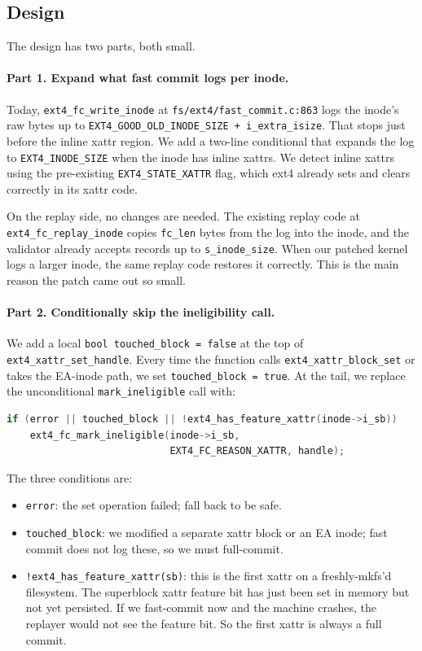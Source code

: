 \documentclass[11pt,a4paper]{article}
\begin{document}
\subsection{Design}

The design has two parts, both small.

\paragraph{Part 1. Expand what fast commit logs per inode.} Today,
\texttt{ext4\_fc\_write\_inode} at \texttt{fs/ext4/fast\_commit.c:863}
logs the inode's raw bytes up to
\texttt{EXT4\_GOOD\_OLD\_INODE\_SIZE + i\_extra\_isize}. That stops
just before the inline xattr region. We add a two-line conditional
that expands the log to \texttt{EXT4\_INODE\_SIZE} when the inode
has inline xattrs. We detect inline xattrs using the pre-existing
\texttt{EXT4\_STATE\_XATTR} flag, which ext4 already sets and clears
correctly in its xattr code.

On the replay side, no changes are needed. The existing replay code
at \texttt{ext4\_fc\_replay\_inode} copies \texttt{fc\_len} bytes
from the log into the inode, and the validator already accepts
records up to \texttt{s\_inode\_size}. When our patched kernel logs
a larger inode, the same replay code restores it correctly. This is
the main reason the patch came out so small.

\paragraph{Part 2. Conditionally skip the ineligibility call.} We
add a local \texttt{bool touched\_block = false} at the top of
\texttt{ext4\_xattr\_set\_handle}. Every time the function calls
\texttt{ext4\_xattr\_block\_set} or takes the EA-inode path, we set
\texttt{touched\_block = true}. At the tail, we replace the
unconditional \texttt{mark\_ineligible} call with:

\begin{lstlisting}[language=C]
if (error || touched_block || !ext4_has_feature_xattr(inode->i_sb))
    ext4_fc_mark_ineligible(inode->i_sb,
                            EXT4_FC_REASON_XATTR, handle);
\end{lstlisting}

The three conditions are:
\begin{itemize}[leftmargin=*]
  \item \texttt{error}: the set operation failed; fall back to be
        safe.
  \item \texttt{touched\_block}: we modified a separate xattr block
        or an EA inode; fast commit does not log these, so we must
        full-commit.
  \item \texttt{!ext4\_has\_feature\_xattr(sb)}: this is the first
        xattr on a freshly-mkfs'd filesystem. The superblock xattr
        feature bit has just been set in memory but not yet
        persisted. If we fast-commit now and the machine crashes,
        the replayer would not see the feature bit. So the first
        xattr is always a full commit.
\end{itemize}
\end{document}
